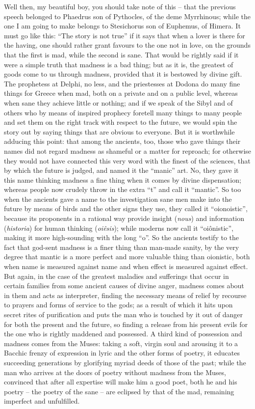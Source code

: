 Well then, my beautiful boy, you should take note of this --
that the previous speech belonged to Phaedrus son of 
Pythocles, of the deme Myrrhinous; while the one I am going to make
belongs to Stesichorus son of Euphemus, of
Himera. It must go like
this: “The story is not true” if it says that when a lover is there for
the having, one should rather grant favours to the one not in love, on
the grounds that the first is mad,  while the second is sane.
That would be rightly said if it were a simple truth that madness is a
bad thing; but as it is, the greatest of goods come to us through
madness, provided that it is bestowed by divine gift. The prophetess at
Delphi, no less, and the priestesses at Dodona do many fine things for
Greece  when mad, both on a private and on a public level,
whereas when sane they achieve little or nothing; and if we speak of the
Sibyl and of others who by means of inspired prophecy foretell 
many things to many people and set them on the right track with respect
to the future, we would spin the story out by saying things that are
obvious to everyone. But it is worthwhile adducing this point: that
among the ancients, too, those who gave things their names did not
regard madness as shameful  or a matter for reproach; for
otherwise they would not have connected this very word with the finest
of the sciences, that by which the future is judged, and named it the
“manic” art. No, they gave it this name thinking madness a fine thing
when it comes by divine dispensation; whereas people now crudely
 throw in the extra “t” and call it
“mantic”. So too when the
ancients gave a name to the investigation sane men make into the future
by means of birds and the other signs they use, they called it
“oionoistic”, because its proponents in a rational way provide insight
({\em nous}) and information ({\em historia}) for human 
thinking ({\em oiêsis}); while moderns now call it “oiônistic”, making
it more high-sounding with the long “o”. So the ancients testify to the
fact that god-sent madness is a finer thing than man-made sanity, by the
very degree that mantic is a more perfect and more valuable thing than
oionistic, both when name is  measured against name and when
effect is measured against effect. But again, in the case of the
greatest maladies and sufferings that occur in certain families from
some ancient causes of divine anger, madness comes about in them and
acts as  interpreter, finding the necessary means of relief by
recourse to prayers and forms of service to the gods; as a result of
which it hits upon secret rites of purification and puts the man who is
touched by it out of
danger for both the present and the future, so finding a release from
his present evils for the one  who is rightly maddened and
possessed. A third kind of possession and madness comes from the
Muses: taking a soft,
virgin soul and arousing it to a Bacchic frenzy of expression in lyric
and the other forms of poetry, it educates succeeding 
generations by glorifying myriad deeds of those of the past; while the
man who arrives at the doors of poetry without madness from the Muses,
convinced that after all expertise will make him a good poet, both he
and his poetry -- the poetry of the sane -- are eclipsed by that of the
mad, remaining imperfect and unfulfilled.

